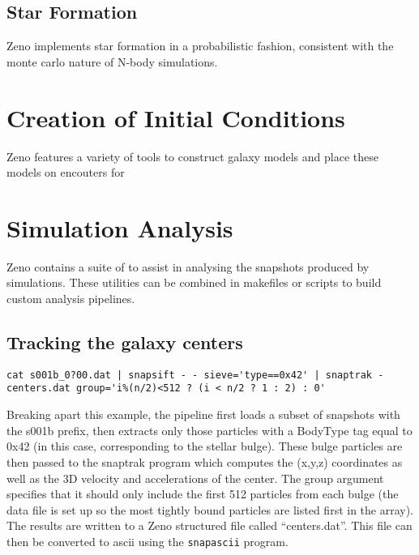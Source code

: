 \documentclass[11pt,letterpaper]{article}
\begin{document}
\subsection{Star Formation}

Zeno implements star formation in a probabilistic fashion, consistent with the monte carlo nature of N-body simulations. 

\section{Creation of Initial Conditions}
\label{sec:IC}

Zeno features a variety of tools to construct galaxy models and place these models on encouters for 

\section{Simulation Analysis}
\label{sec:Analysis}

Zeno contains a suite of to assist in analysing the snapshots produced by simulations. These utilities can be combined in makefiles or scripts to build custom analysis pipelines.

\subsection{Tracking the galaxy centers}

\begin{verbatim}
cat s001b_0?00.dat | snapsift - - sieve='type==0x42' | snaptrak - centers.dat group='i%(n/2)<512 ? (i < n/2 ? 1 : 2) : 0'
\end{verbatim}

Breaking apart this example, the pipeline first loads a subset of snapshots with the s001b prefix, then extracts only those particles with a BodyType tag equal to 0x42 (in this case, corresponding to the stellar bulge). These bulge particles are then passed to the snaptrak program which computes the (x,y,z) coordinates as well as the 3D velocity and accelerations of the center. The group argument specifies that it should only include the first 512 particles from each bulge (the data file is set up so the most tightly bound particles are listed first in the array). The results are written to a Zeno structured file called ``centers.dat''. This file can then be converted to ascii using the \texttt{snapascii} program.
\end{document}
